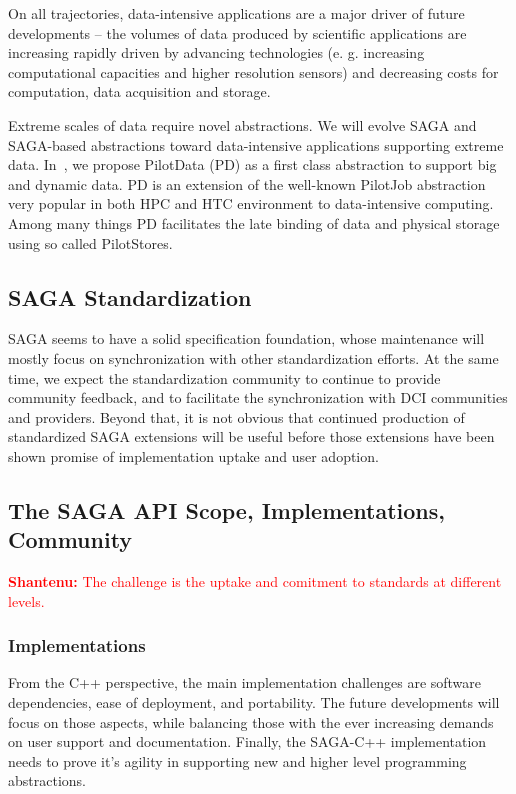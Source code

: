 \documentclass{article}
\newcommand{\B}[1]{\textbf{#1}}
\newcommand{\jhanote}[1]{{\textcolor{red}{     \B{Shantenu:} #1 }}}
\newcommand{\jhanote}[1]{}
\begin{document}
  On all trajectories, data-intensive applications are a major driver of
  future developments -- the volumes of data produced by scientific
  applications are increasing rapidly driven by advancing technologies
  (e. g. increasing computational capacities and higher resolution
  sensors) and decreasing costs for computation, data acquisition and
  storage.

  Extreme scales of data require novel abstractions. We will evolve SAGA
  and SAGA-based abstractions toward data-intensive applications
  supporting extreme data.  In~\cite{troy-2011}, we propose PilotData
  (PD) as a first class abstraction to support big and dynamic data. PD
  is an extension of the well-known PilotJob abstraction very popular in
  both HPC and HTC environment to data-intensive computing.  Among many
  things PD facilitates the late binding of data and physical storage
  using so called PilotStores.

 \subsection{SAGA Standardization}

  SAGA seems to have a solid specification foundation, whose maintenance
  will mostly focus on synchronization with other standardization
  efforts.  At the same time, we expect the standardization community to
  continue to provide community feedback, and to facilitate the
  synchronization with DCI communities and providers.  Beyond that, it
  is not obvious that continued production of standardized SAGA
  extensions will be useful before those extensions have been shown
  promise of implementation uptake and user adoption.  

  
 \subsection{The SAGA API Scope, Implementations, Community}

 \jhanote{The challenge is the uptake and comitment to standards at
   different levels.}

 \subsubsection{Implementations}

  From the C++ perspective, the main implementation challenges are
  software dependencies, ease of deployment, and portability.  The
  future developments will focus on those aspects, while balancing those
  with the ever increasing demands on user support and documentation.
  Finally, the SAGA-C++ implementation needs to prove it's agility in
  supporting new and higher level programming abstractions. 
\end{document}
